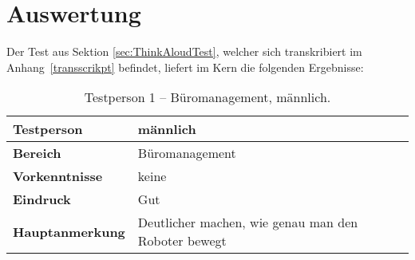 \section{Auswertung}
Der Test aus Sektion \ref{sec:ThinkAloudTest}, welcher sich transkribiert im Anhang~\ref{transscrikpt} befindet, liefert im Kern die folgenden Ergebnisse:
\begin{table}[H]
	\centering
	\begin{tabular}{|l|p{8cm}|}
		\hline
		\textbf{Testperson} & männlich  \\
		\hline
		\textbf{Bereich} & Büromanagement \\
		\hline
		\textbf{Vorkenntnisse} & keine \\
		\hline
		\textbf{Eindruck} & Gut \\
		\hline
		\textbf{Hauptanmerkung} & Deutlicher machen, wie genau man den Roboter bewegt\\
		\hline
	\end{tabular}
	\caption{Testperson 1 -- Büromanagement, männlich.}
	\label{tab:scoreOffice1}
\end{table}

